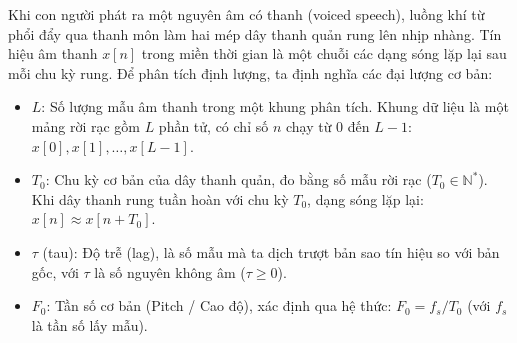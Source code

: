 \documentclass[11pt,a4paper]{article}
\begin{document}
Khi con người phát ra một nguyên âm có thanh (voiced speech), luồng khí từ phổi đẩy qua thanh môn làm hai mép dây thanh quản rung lên nhịp nhàng. Tín hiệu âm thanh $x[n]$ trong miền thời gian là một chuỗi các dạng sóng lặp lại sau mỗi chu kỳ rung. Để phân tích định lượng, ta định nghĩa các đại lượng cơ bản:
\begin{itemize}
    \setlength{\itemsep}{0.5pt}
    \item $L$: Số lượng mẫu âm thanh trong một khung phân tích. Khung dữ liệu là một mảng rời rạc gồm $L$ phần tử, có chỉ số $n$ chạy từ $0$ đến $L - 1$: $x[0], x[1], \dots, x[L - 1]$.
    \item $T_0$: Chu kỳ cơ bản của dây thanh quản, đo bằng số mẫu rời rạc ($T_0 \in \mathbb{N}^*$). Khi dây thanh rung tuần hoàn với chu kỳ $T_0$, dạng sóng lặp lại: $x[n] \approx x[n + T_0]$.
    \item $\tau$ (tau): Độ trễ (lag), là số mẫu mà ta dịch trượt bản sao tín hiệu so với bản gốc, với $\tau$ là số nguyên không âm ($\tau \ge 0$).
    \item $F_0$: Tần số cơ bản (Pitch / Cao độ), xác định qua hệ thức: $F_0 = f_s / T_0$ (với $f_s$ là tần số lấy mẫu).
\end{itemize}
\end{document}
